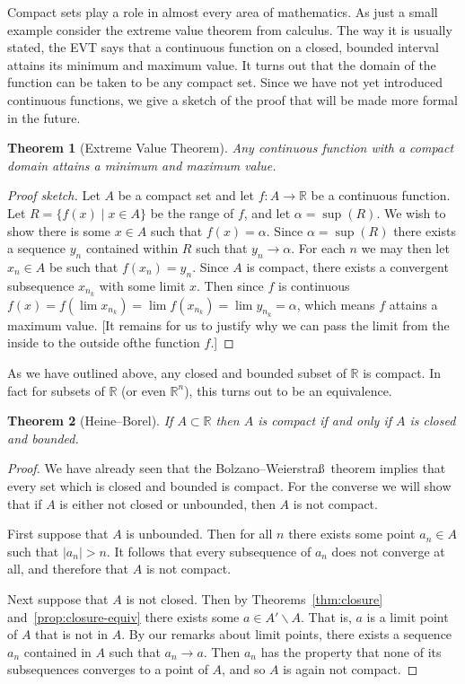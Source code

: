\documentclass[11pt,oneside]{amsbook}
\newcommand{\RR}{\mathbb R}
\renewcommand{\setminus}{\smallsetminus}
\theoremstyle{definition}
\theoremstyle{plain}
\newtheorem{thm}{Theorem}[section]
\theoremstyle{definition}
\theoremstyle{remark}
\numberwithin{equation}{section}
\numberwithin{figure}{section}
\begin{document}
Compact sets play a role in almost every area of mathematics. As just a small example consider the extreme value theorem from calculus. The way it is usually stated, the EVT says that a continuous function on a closed, bounded interval attains its minimum and maximum value. It turns out that the domain of the function can be taken to be any compact set. Since we have not yet introduced continuous functions, we give a sketch of the proof that will be made more formal in the future.

\begin{thm}[Extreme Value Theorem]
  Any continuous function with a compact domain attains a minimum and maximum value.
\end{thm}

\begin{proof}[Proof sketch]
  Let $A$ be a compact set and let $f\colon A\to\RR$ be a continuous function. Let $R=\{f(x)\mid x\in A\}$ be the range of $f$, and let $\alpha=\sup(R)$. We wish to show there is some $x\in A$ such that $f(x)=\alpha$. Since $\alpha=\sup(R)$ there exists a sequence $y_n$ contained within $R$ such that $y_n\to\alpha$. For each $n$ we may then let $x_n\in A$ be such that $f(x_n)=y_n$. Since $A$ is compact, there exists a convergent subsequence $x_{n_k}$ with some limit $x$. Then since $f$ is continuous $f(x)=f(\lim x_{n_k})=\lim f(x_{n_k})=\lim y_{n_k}=\alpha$, which means $f$ attains a maximum value. [It remains for us to justify why we can pass the limit from the inside to the outside ofthe function $f$.]
\end{proof}

As we have outlined above, any closed and bounded subset of $\RR$ is compact. In fact for subsets of $\RR$ (or even $\RR^n$), this turns out to be an equivalence.

\begin{thm}[Heine--Borel]
  If $A\subset\RR$ then $A$ is compact if and only if $A$ is closed and bounded.
\end{thm}

\begin{proof}
  We have already seen that the Bolzano--Weierstra\ss\ theorem implies that every set which is closed and bounded is compact. For the converse we will show that if $A$ is either not closed or unbounded, then $A$ is not compact.

  First suppose that $A$ is unbounded. Then for all $n$ there exists some point $a_n\in A$ such that $|a_n|>n$. It follows that every subsequence of $a_n$ does not converge at all, and therefore that $A$ is not compact.

  Next suppose that $A$ is not closed. Then by Theorems~\ref{thm:closure} and~\ref{prop:closure-equiv} there exists some $a\in A'\setminus A$. That is, $a$ is a limit point of $A$ that is not in $A$. By our remarks about limit points, there exists a sequence $a_n$ contained in $A$ such that $a_n\to a$. Then $a_n$ has the property that none of its subsequences converges to a point of $A$, and so $A$ is again not compact.
\end{proof}
\end{document}
